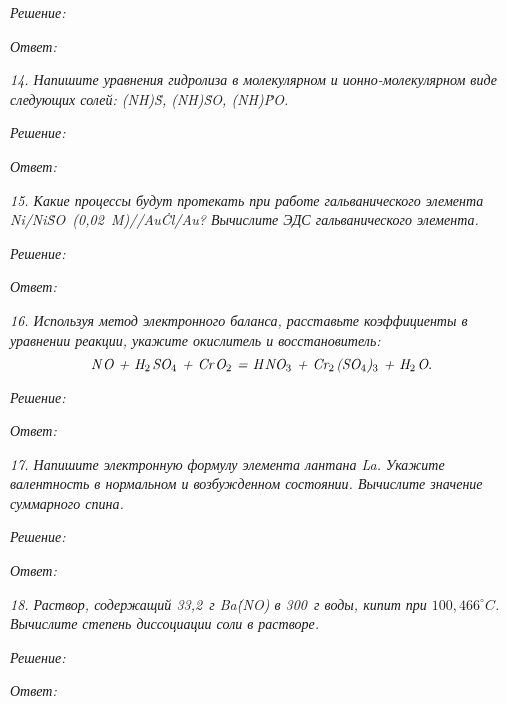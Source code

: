 \vspace*{2em}
\emph{Решение:}

\vspace*{2em}
\emph{Ответ: }

\newpage %

\emph{14. Напишите уравнения гидролиза в молекулярном и ионно-молекулярном виде
следующих солей: (NH)\.S, (NH)\.SO,
(NH)\.PO.}

\vspace*{2em}
\emph{Решение:}

\vspace*{2em}
\emph{Ответ: }

\newpage %

\emph{15. Какие процессы будут протекать при работе гальванического элемента
Ni\;/\;Ni\.SO\ (0,02~M)\;//\;Au\.Cl\;/\;Au? Вычислите ЭДС гальванического
элемента.}

\vspace*{2em}
\emph{Решение:}

\vspace*{2em}
\emph{Ответ: }

\newpage %

\emph{16. Используя метод электронного баланса, расставьте коэффициенты в
уравнении реакции, укажите окислитель и восстановитель:} \vspace*{-1em}
\[
    \textit{N\;\!O + H\( _{2} \)\;\!SO\( _{4} \) + Cr\;\!O\( _{2} \) = H\;\!NO\( _{3} \) +
    Cr\( _{2} \)\;\!(SO\( _{4} \))\( _{3} \) + H\( _{2} \)\;\!O}.
\]

\vspace*{1em}
\emph{Решение:}

\vspace*{2em}
\emph{Ответ: }

\newpage %

\emph{17. Напишите электронную формулу элемента лантана La. Укажите валентность
в нормальном и возбужденном состоянии. Вычислите значение суммарного спина.}

\vspace*{2em}
\emph{Решение:}

\vspace*{2em}
\emph{Ответ: }

\newpage %

\emph{18. Раствор, содержащий 33,2~г Ba\.(NO) в 300~г воды, кипит
при \( 100,\!466^\circ C\). Вычислите степень диссоциации соли в растворе.}

\vspace*{2em}
\emph{Решение:}

\vspace*{2em}
\emph{Ответ: }


